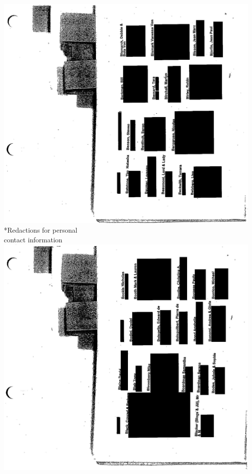 \documentclass[10pt]{article}
\begin{document}
\includegraphics[max width=\textwidth, center]{2025_02_27_dd68c3d38de88f0516d9g-127}\\
*Redactions for personal\\
contact information\\
\includegraphics[max width=\textwidth, center]{2025_02_27_dd68c3d38de88f0516d9g-128}\\
\end{document}
